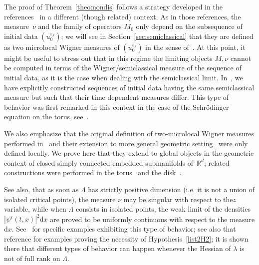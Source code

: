 \documentclass[10pt]{amsart}
\theoremstyle{definition}
\newcommand*\R{{\mathbb R}}
\newcommand*\eps{\varepsilon}
\numberwithin{equation}{section}
\newcommand*{\dd}{\mathrm{d}}
\newcommand*{\dx}{\dd x}
\begin{document}


The proof of Theorem~\ref{theo:nondis} follows a strategy developed in the references~\cite{AFM:15,AM:12,MaciaTorus} in a different (though related) context. As in those references, the measure~$\nu$ and the family of operators $M_0$ only depend on the subsequence of initial data $(u^{\eps_k}_0)$; we will see in Section~\ref{sec:semiclassical} that they are defined as two microlocal Wigner measures of $(u^{\eps_k}_0)$ in the sense of~\cite{Fethese95,F2micro:00,F2micro:05,MaciaTorus}. At this point, it might be useful to stress out that in this regime the limiting objects $M,\nu$ cannot be computed in terms of the Wigner/semiclassical measure of the sequence of initial data, as it is the case when dealing with the semiclassical limit. In~\cite{CFMProc}, we have explicitly constructed sequences of initial data having the same semiclassical measure but such that their time dependent measures differ. This type of behavior was first remarked in this context in the case of the Schr\"odinger equation on the torus, see~\cite{MaciaAv,MaciaTorus}.


We also emphasize that the original definition of two-microlocal Wigner measures performed in~\cite{F2micro:00} and their extension to more general geometric setting~\cite{F2micro:05} were only defined locally. We prove here that they extend to global objects in the geometric context of closed simply connected embedded submanifolds of~$\R^d$; related constructions were performed in the torus~\cite{AFM:15,AM:12,MaciaTorus,MR:18} and the disk~\cite{ALM:16}.



See also, that as soon as $\Lambda$ has strictly positive dimension (i.e. it is not a union of isolated critical points), the measure $\nu$ may be singular with respect to the\linebreak $z$ variable, while when $\Lambda$ consists in isolated points, the weak limit of the densities $|\psi^\eps(t,x)|^2\dx$ are proved to be uniformly continuous with respect to the measure $\dx$. See~\cite{CFMProc} for specific examples exhibiting this type of behavior; see also that reference for examples proving the necessity of Hypothesis~\eqref{list2H2}; it is shown there that different types of behavior can happen whenever the Hessian of $\lambda$ is not of full rank on $\Lambda$.

\end{document}
